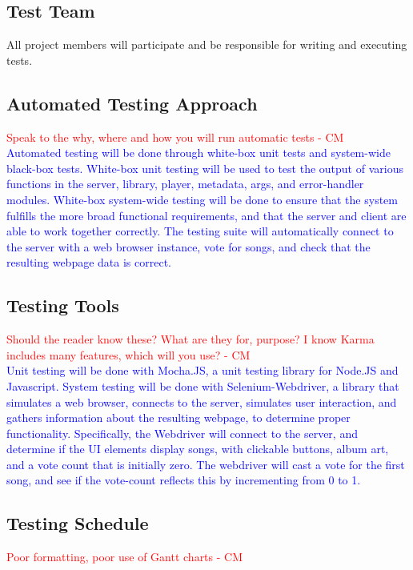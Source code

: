 \documentclass[12pt, titlepage]{article}
\begin{document}
\subsection{Test Team}
All project members will participate and be responsible for writing and executing tests.

\subsection{Automated Testing Approach}
\textcolor{red}{Speak to the why, where and how you will run automatic tests - CM} \\

\textcolor{blue}{
Automated testing will be done through white-box unit tests and system-wide black-box tests. White-box unit testing will be used to test the output of various functions in the server, library, player, metadata, args, and error-handler modules.
White-box system-wide testing will be done to ensure that the system fulfills the more broad functional requirements, and that the server and client are able to work together correctly. The testing suite will automatically connect to the server with a web browser instance, vote for songs, and check that the resulting webpage data is correct.
}

\subsection{Testing Tools}
\textcolor{red}{Should the reader know these? What are they for, purpose? I know Karma includes many features, which will you use? - CM} \\

\textcolor{blue}{
Unit testing will be done with Mocha.JS, a unit testing
library for Node.JS and Javascript.
System testing will be done with Selenium-Webdriver, a library that simulates a web browser, connects to the server,
simulates user interaction, and gathers information about the resulting webpage, to determine proper functionality. Specifically, the Webdriver will connect to the server, and determine if the UI elements display songs, with clickable buttons, album art, and a vote count that is initially zero. The webdriver will cast a vote for the first song, and see if the vote-count reflects this by incrementing from 0 to 1.
}

\subsection{Testing Schedule}
\textcolor{red}{Poor formatting, poor use of Gantt charts - CM} \\
\end{document}
